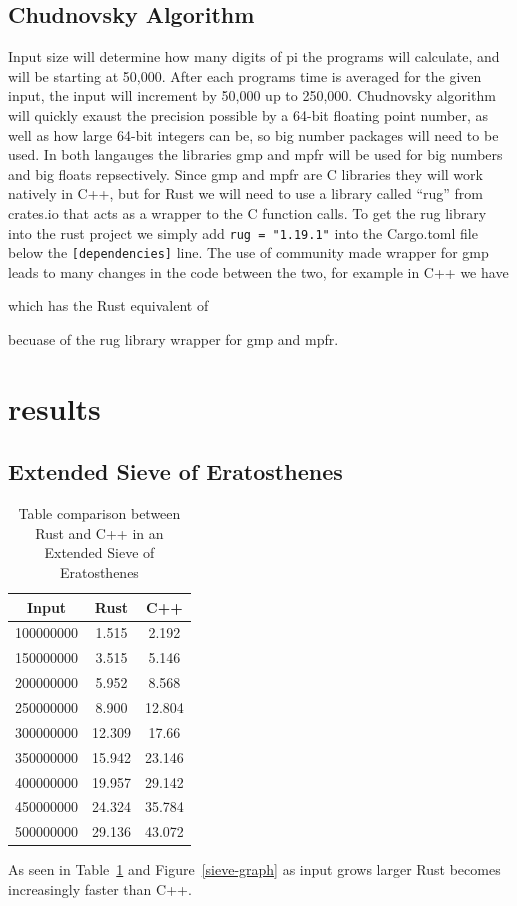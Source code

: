 \documentclass[10pt]{IEEEtran}
\begin{document}
\subsection{Chudnovsky Algorithm}
Input size will determine how many digits of pi the programs will calculate, and will be starting at 50,000. 
After each programs time is averaged for the given input, the input will increment by 50,000 up to 250,000.
Chudnovsky algorithm will quickly exaust the precision possible by a 64-bit floating point number, as well as how large 64-bit integers can be, so big number packages will need to be used.
In both langauges the libraries gmp\cite{gmp} and mpfr\cite{mpfr} will be used for big numbers and big floats repsectively.
Since gmp and mpfr are C libraries they will work natively in C++, but for Rust we will need to use a library called ``rug'' from crates.io that acts as a wrapper to the C function calls\cite{rug}.
To get the rug library into the rust project we simply add \verb|rug = "1.19.1"| into the Cargo.toml file below the \verb|[dependencies]| line.
The use of community made wrapper for gmp leads to many changes in the code between the two, for example in C++ we have

which has the Rust equivalent of

becuase of the rug library wrapper for gmp and mpfr.
\section{results}
\subsection{Extended Sieve of Eratosthenes}
\begin{table}[!ht]
    \centering
    \begin{tabular}{|c|cc|}
        \hline
        \rowcolor{lightgray}
            Input & Rust & C++ \\ \hline
            100000000 & 1.515 & 2.192 \\ 
            150000000 & 3.515 & 5.146 \\ 
            200000000 & 5.952 & 8.568 \\ 
            250000000 & 8.900 & 12.804 \\ 
            300000000 & 12.309 & 17.66 \\ 
            350000000 & 15.942 & 23.146 \\ 
            400000000 & 19.957 & 29.142 \\ 
            450000000 & 24.324 & 35.784 \\ 
            500000000 & 29.136 & 43.072\\ \hline
        \end{tabular}
    \caption{\label{sieve-table}Table comparison between Rust and C++ in an Extended Sieve of Eratosthenes}
\end{table}
As seen in Table~\ref{sieve-table} and Figure~\ref{sieve-graph} as input grows larger Rust becomes increasingly faster than C++.
\end{document}

